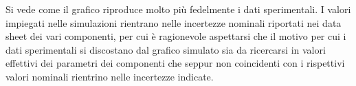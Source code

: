 \documentclass[journal, a4paper]{IEEEtran}
\begin{document}
Si vede come il grafico riproduce molto più fedelmente i dati sperimentali. I valori impiegati nelle simulazioni rientrano nelle incertezze nominali riportati nei data sheet dei vari componenti, per cui è ragionevole aspettarsi che il motivo per cui i dati sperimentali si discostano dal grafico simulato sia da ricercarsi in valori effettivi dei parametri dei componenti che seppur non coincidenti con i rispettivi valori nominali rientrino nelle incertezze indicate.




\end{document}
